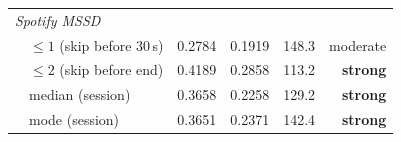 \begin{table}[ht]
\begin{tabular}{llrrrr}
\midrule
\multicolumn{6}{l}{\textit{Spotify MSSD}} \\
              & $\leq1$ (skip before 30\,s)   & 0.2784 & 0.1919 & 148.3 & moderate \\
              & $\leq2$ (skip before end)      & 0.4189 & 0.2858 & 113.2 & \textbf{strong} \\
              & median (session)               & 0.3658 & 0.2258 & 129.2 & \textbf{strong} \\
              & mode (session)                 & 0.3651 & 0.2371 & 142.4 & \textbf{strong} \\
\bottomrule
\end{tabular}
\end{table}
